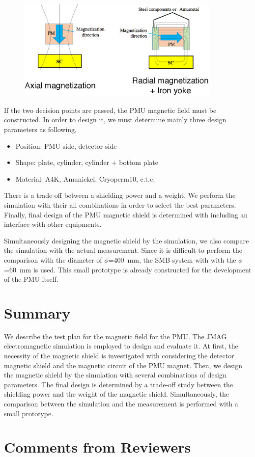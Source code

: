 \documentclass[11pt]{article}
\begin{document}
\begin{figure}[htbp]
  \centering
  \includegraphics[width=100mm]{figs/MagneticCircuit.eps}
  \caption{}
  \label{fig:MC}
\end{figure}

If the two decision points are passed, the PMU magnetic field must be constructed.
In order to design it, we must determine mainly three design parameters as following,
\begin{itemize}
 \item Position: PMU side, detector side
 \item Shape: plate, cylinder, cylinder + bottom plate
 \item Material: A4K, Amunickel, Cryoperm10, e.t.c.
\end{itemize}
There is a trade-off between a shielding power and a weight.
We perform the simulation with their all combinations in order to select the best parameters.
Finally, final design of the PMU magnetic shield is determined with including an interface with other equipments.

Simultaneously designing the magnetic shield by the simulation, we also compare the simulation with the actual measurement.
Since it is difficult to perform the comparison with the diameter of $\phi$=400~mm, the SMB system with with the $\phi$=60~mm is used.
This small prototype is already constructed for the development of the PMU itself.



\section*{Summary}
We describe the test plan for the magnetic field for the PMU.
The JMAG electromagnetic simulation is employed to design and evaluate it.
At first, the necessity of the magnetic shield is investigated with considering the detector magnetic shield and the magnetic circuit of the PMU magnet.
Then, we design the magnetic shield by the simulation with several combinations of design parameters.
The final design is determined by a trade-off study between the shielding power and the weight of the magnetic shield.
Simultaneously, the comparison between the simulation and the measurement is performed with a small prototype.


\section*{Comments from Reviewers}
\end{document}
